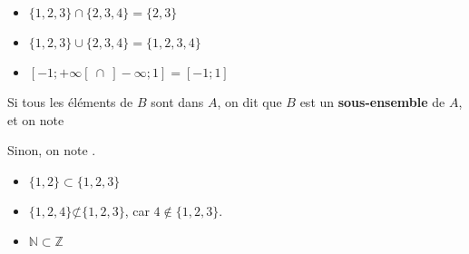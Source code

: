\documentclass[classe=$2^{de}$]{coursclass}
\begin{document}
\begin{exemple}
	\begin{itemize}
		\item $\{1, 2, 3\} ∩ \{2, 3, 4\} = \{2, 3\}$
		\item $\{1, 2, 3\} ∪ \{2, 3, 4\} = \{1, 2, 3, 4\}$
		\item $[-1 ; +∞[\ ∩\ ]-∞ ; 1] = [-1 ; 1]$
	\end{itemize}
\end{exemple}

\begin{definition}
	Si tous les éléments de $B$ sont dans $A$, on dit que $B$ est un \textbf{sous-ensemble} de $A$, et on note 

	Sinon, on note .
\end{definition}

\begin{exemple}
	\begin{itemize}
		\item $\{1, 2\} ⊂ \{1, 2, 3\}$
		\item $\{1, 2, 4\} \not⊂ \{1, 2, 3\}$, car $4 ∉ \{1, 2, 3\}$.
		\item $ℕ ⊂ ℤ$
	\end{itemize}
\end{exemple}
\end{document}
